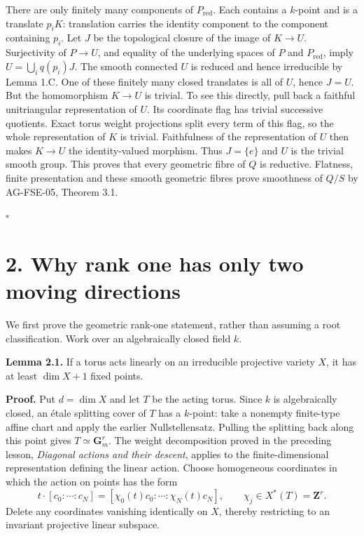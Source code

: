 \documentclass[11pt,a4paper,openany]{report}
\newcounter{none}
\begin{document}
There are only finitely many components of \(P_{\mathrm{red}}\). Each contains a \(k\)-point and is a translate \(p_iK\): translation carries the identity component to the component containing \(p_i\). Let \(J\) be the topological closure of the image of \(K\to U\). Surjectivity of \(P\to U\), and equality of the underlying spaces of \(P\) and \(P_{\mathrm{red}}\), imply \(U=\bigcup_i q(p_i)J\). The smooth connected \(U\) is reduced and hence irreducible by Lemma 1.C. One of these finitely many closed translates is all of \(U\), hence \(J=U\). But the homomorphism \(K\to U\) is trivial. To see this directly, pull back a faithful unitriangular representation of \(U\). Its coordinate flag has trivial successive quotients. Exact torus weight projections split every term of this flag, so the whole representation of \(K\) is trivial. Faithfulness of the representation of \(U\) then makes \(K\to U\) the identity-valued morphism. Thus \(J=\{e\}\) and \(U\) is the trivial smooth group. This proves that every geometric fibre of \(Q\) is reductive. Flatness, finite presentation and these smooth geometric fibres prove smoothness of \(Q/S\) by AG-FSE-05, Theorem 3.1.

\(\square\)

\section{2. Why rank one has only two moving directions}\label{AG-RG-03-why-rank-one-has-only-two-moving-directions}

We first prove the geometric rank-one statement, rather than assuming a root classification. Work over an algebraically closed field \(k\).

\textbf{Lemma 2.1.} If a torus acts linearly on an irreducible projective variety \(X\), it has at least \(\dim X+1\) fixed points.

\textbf{Proof.} Put \(d=\dim X\) and let \(T\) be the acting torus. Since \(k\) is algebraically closed, an étale splitting cover of \(T\) has a \(k\)-point: take a nonempty finite-type affine chart and apply the earlier Nullstellensatz. Pulling the splitting back along this point gives \(T\simeq\mathbf G_m^r\). The weight decomposition proved in the preceding lesson, \emph{Diagonal actions and their descent}, applies to the finite-dimensional representation defining the linear action. Choose homogeneous coordinates in which the action on points has the form \[
 t\cdot[c_0:\cdots:c_N]
       =[\chi_0(t)c_0:\cdots:\chi_N(t)c_N],
 \qquad \chi_j\in X^*(T)=\mathbf Z^r.
\] Delete any coordinates vanishing identically on \(X\), thereby restricting to an invariant projective linear subspace.
\end{document}
